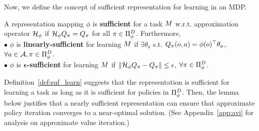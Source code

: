 Now, we define the concept of sufficient representation for learning in an MDP.
\begin{definition}
\label{def:suf_learn}
A representation mapping $\phi$ is \textbf{sufficient} for a task $M$ w.r.t. approximation operator $\mathcal{H}_{\phi}$ if $\mathcal{H}_{\phi} Q_\pi = Q_\pi$ for all $\pi\in\Pi_{\phi}^D$. Furthermore, \\
$\bullet$ $\phi$ is \textbf{linearly-sufficient} for learning $M$ if $\exists\theta_a$ s.t. $Q_\pi(o,a)=\phi(o)^\top\theta_a$, $\forall a\in\mathcal{A}, \pi\in\Pi_{\phi}^D$. \\
$\bullet$ $\phi$ is $\boldsymbol{\epsilon}$\textbf{-sufficient} for learning $M$ if $\|\mathcal{H}_{\phi}Q_\pi - Q_\pi\| \leq \epsilon$, $\forall \pi\in\Pi_{\phi}^D$.
\end{definition}

Definition~\ref{def:suf_learn} suggests that the representation is sufficient for learning a task as long as it is sufficient for policies in $\Pi_{\phi}^D$.
Then, the lemma below justifies that a nearly sufficient representation can ensure that approximate policy iteration converges to a near-optimal solution. (See Appendix~\ref{app:avi} for analysis on approximate value iteration.)

